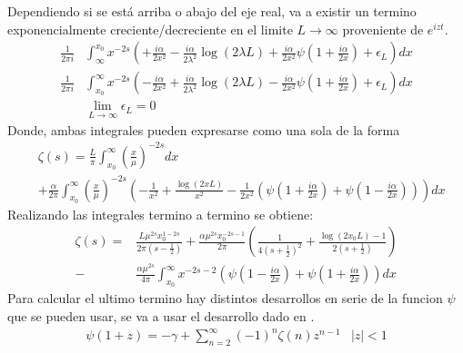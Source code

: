 Dependiendo si se está arriba o abajo del eje real, va a existir un termino exponencialmente creciente/decreciente en el limite $L \rightarrow \infty$  proveniente de $e ^{i z t}$.
\begin{align}
	\frac{ 1 }{2 \pi i}  
&	
	\int _{\infty} ^{x _0} 
	x ^{-2s}
	\left( +
	\frac{i \alpha}{2 x^2} - 
	\frac{i \alpha }{2 \lambda ^2} \log ( 2 \lambda L ) +
	\frac{i \alpha}{2 x ^2 } \psi \left( 1 + \frac{i \alpha}{2 x} \right) +
	\epsilon _L
	\right)
	d x
\\
	\frac{ 1 }{2 \pi i}  
&	
	\int _{x _0} ^{\infty} 
	x ^{-2s}
	\left( -
	\frac{i \alpha}{2 x^2} + 
	\frac{i \alpha }{2 \lambda ^2} \log ( 2 \lambda L ) -
	\frac{i \alpha}{2 x ^2 } \psi \left( 1 + \frac{i \alpha}{2 x} \right) +
	\epsilon _L
	\right)
	d x
\\
&
	\lim \limits _{L \rightarrow \infty} \epsilon _L = 0
\end{align}
Donde, ambas integrales pueden expresarse como una sola de la forma
\begin{align}
&
	\zeta (s)=
	\frac{L }{\pi}
	\int _ {x_0} ^{\infty} \left( \frac{x}{\mu} \right) ^{-2s} dx
\\	 
& 
\nonumber
	+
	\frac{\alpha }{2 \pi } \int _{x_0} ^{\infty} 
	\left( \frac{x}{\mu} \right) ^{-2s}
	\left(-
	\frac{1}{ x ^2} +
	\frac{\log \left( 2 x L \right) }{x ^2}  -
	\frac{1}{ 2 x ^2 } 
	\left(
	\psi \left( 1 + \frac{i \alpha}{2  x} \right) + \psi \left( 1 - \frac{i \alpha}{2 x} \right) 
	\right)
	\right)
	d x
\end{align}
Realizando las integrales termino a termino se obtiene:
\begin{align}
	\zeta (s)=
&
\nonumber
	\frac{L  \mu ^{2s} x _0 ^{1-2s} }{2 \pi \left( s- \frac{1}{2} \right)}  + 
	\frac{\alpha \mu ^{2s} x _{0} ^{-2s-1} }{2 \pi} 
	\left( 
	\frac{1}{4 \left(s+ \frac{1}{2} \right) ^2} +
	\frac{\log(2 x _0 L) -1 }{2 \left(s+\frac{1}{2} \right)} 
	\right) 
\\
-
&	
	\frac{\alpha \mu ^{2s} }{4 \pi}
	\int _{x_0} ^{\infty} 
	x ^{-2s-2}
	\left(
	\psi \left( 1 - \frac{i \alpha}{2 x} \right) +
	\psi \left( 1 + \frac{i \alpha}{2 x} \right)
	\right)
	dx
\end{align}
Para calcular el ultimo termino hay distintos desarrollos en serie de la funcion $\psi $ que se pueden usar, se va a usar el desarrollo dado en \cite{Abramowitz:1974:HMF:1098650}.
\begin{equation}
\begin{array}{cc}
\psi (1+ z ) = - \gamma + \sum \limits_{n=2}^{\infty} (-1) ^n \zeta (n) z ^{n-1} & |z| < 1
\end{array}
\label{repr}
\end{equation}
